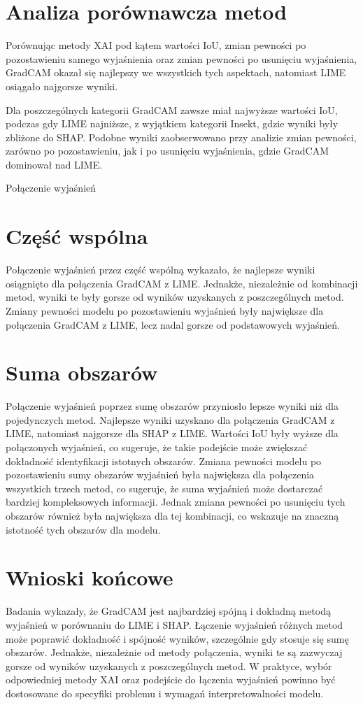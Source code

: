 \section*{Analiza porównawcza metod}

Porównując metody XAI pod kątem wartości IoU, zmian pewności po pozostawieniu samego wyjaśnienia oraz zmian pewności po usunięciu wyjaśnienia, GradCAM okazał się najlepszy we wszystkich tych aspektach, natomiast LIME osiągało najgorsze wyniki.

Dla poszczególnych kategorii GradCAM zawsze miał najwyższe wartości IoU, podczas gdy LIME najniższe, z wyjątkiem kategorii Insekt, gdzie wyniki były zbliżone do SHAP.
Podobne wyniki zaobserwowano przy analizie zmian pewności, zarówno po pozostawieniu, jak i po usunięciu wyjaśnienia, gdzie GradCAM dominował nad LIME.

Połączenie wyjaśnień
\section*{Część wspólna}

Połączenie wyjaśnień przez część wspólną wykazało, że najlepsze wyniki osiągnięto dla połączenia GradCAM z LIME.
Jednakże, niezależnie od kombinacji metod, wyniki te były gorsze od wyników uzyskanych z poszczególnych metod.
Zmiany pewności modelu po pozostawieniu wyjaśnień były największe dla połączenia GradCAM z LIME, lecz nadal gorsze od podstawowych wyjaśnień.

\section*{Suma obszarów}

Połączenie wyjaśnień poprzez sumę obszarów przyniosło lepsze wyniki niż dla pojedynczych metod.
Najlepsze wyniki uzyskano dla połączenia GradCAM z LIME, natomiast najgorsze dla SHAP z LIME.
Wartości IoU były wyższe dla połączonych wyjaśnień, co sugeruje, że takie podejście może zwiększać dokładność identyfikacji istotnych obszarów.
Zmiana pewności modelu po pozostawieniu sumy obszarów wyjaśnień była największa dla połączenia wszystkich trzech metod, co sugeruje, że suma wyjaśnień może dostarczać bardziej kompleksowych informacji.
Jednak zmiana pewności po usunięciu tych obszarów również była największa dla tej kombinacji, co wskazuje na znaczną istotność tych obszarów dla modelu.

\section*{Wnioski końcowe}

Badania wykazały, że GradCAM jest najbardziej spójną i dokładną metodą wyjaśnień w porównaniu do LIME i SHAP. Łączenie wyjaśnień różnych metod może poprawić dokładność i spójność wyników, szczególnie gdy stosuje się sumę obszarów.
Jednakże, niezależnie od metody połączenia, wyniki te są zazwyczaj gorsze od wyników uzyskanych z poszczególnych metod.
W praktyce, wybór odpowiedniej metody XAI oraz podejście do łączenia wyjaśnień powinno być dostosowane do specyfiki problemu i wymagań interpretowalności modelu.
